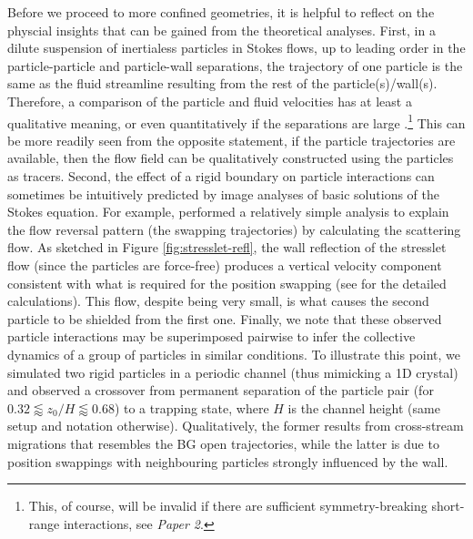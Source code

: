Before we proceed to more confined geometries, it is helpful to reflect on the physcial insights that can be gained from the theoretical analyses.
First, in a dilute suspension of inertialess particles in Stokes flows, up to leading order in the particle-particle and particle-wall separations, the trajectory of one particle is the same as the fluid streamline resulting from the rest of the particle(s)/wall(s). Therefore, a comparison of the particle and fluid velocities has at least a qualitative meaning, or even quantitatively if the separations are large \citep{zurita-gotor_2007}.\footnote{This, of course, will be invalid if there are sufficient symmetry-breaking short-range interactions, see \eg \emph{Paper 2}.}
This can be more readily seen from the opposite statement, \viz if the particle trajectories are available, then the flow field can be qualitatively constructed using the particles as tracers.
Second, the effect of a rigid boundary on particle interactions can sometimes be intuitively predicted by image analyses of basic solutions of the Stokes equation.
For example, \cite{zurita-gotor_2007} performed a relatively simple analysis to explain the flow reversal pattern (\ie the swapping trajectories) by calculating the scattering flow.
As sketched in Figure \ref{fig:stresslet-refl}, the wall reflection of the stresslet flow (since the particles are force-free) produces a vertical velocity component consistent with what is required for the position swapping (see \cite{zurita-gotor_2007} for the detailed calculations). This flow, despite being very small, is what causes the second particle to be shielded from the first one.
Finally, we note that these observed particle interactions may be superimposed pairwise to infer the collective dynamics of a group of particles in similar conditions.
To illustrate this point, we simulated two rigid particles in a periodic channel (thus mimicking a 1D crystal) and observed a crossover from permanent separation of the particle pair (for $0.32 \lessapprox z_0/H \lessapprox 0.68$) to a trapping state, where $H$ is the channel height (same setup and notation otherwise).
Qualitatively, the former results from cross-stream migrations that resembles the BG open trajectories, while the latter is due to position swappings with neighbouring particles strongly influenced by the wall. 

